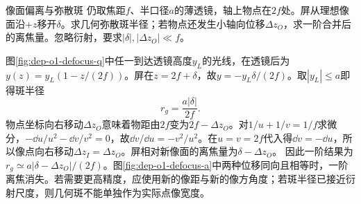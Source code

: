 \begin{example}像面偏离与弥散斑
仍取焦距$f$、半口径$a$的薄透镜，轴上物点在$2f$处。屏从理想像面沿$+z$移开$\delta$。求几何弥散斑半径；若物点还发生小轴向位移$\Delta z_O$，求一阶合并后的离焦量。忽略衍射，要求$|\delta|,|\Delta z_O|\ll f$。
\end{example}
\begin{solution}
图\ref{fig:dep-o1-defocus-q}中任一到达透镜高度$y_L$的光线，在透镜后为$y(z)=y_L(1-z/(2f))$。屏在$z=2f+\delta$，故$y=-y_L\delta/(2f)$。取$|y_L|\leq a$即得斑半径
\[
 r_g=\frac{a|\delta|}{2f}.
\]
物点坐标向右移动$\Delta z_O$意味着物距由$2f$变为$2f-\Delta z_O$。对$1/u+1/v=1/f$求微分，$-\dd u/u^2-\dd v/v^2=0$，故$\dd v/\dd u=-v^2/u^2$。在$u=v=2f$代入得$\dd v=-\dd u$，所以像点向右移动$\Delta z_I=\Delta z_O$。屏相对新像面的离焦量为$\delta-\Delta z_O$。
因此一阶结果为$r_g\simeq a|\delta-\Delta z_O|/(2f)$。图\ref{fig:dep-o1-defocus-a}中两种位移同向且相等时，一阶离焦消失。若需要更高精度，应使用新的像距与新的像方角度；若斑半径已接近衍射尺度，则几何斑不能单独作为实际点像宽度。
\end{solution}

